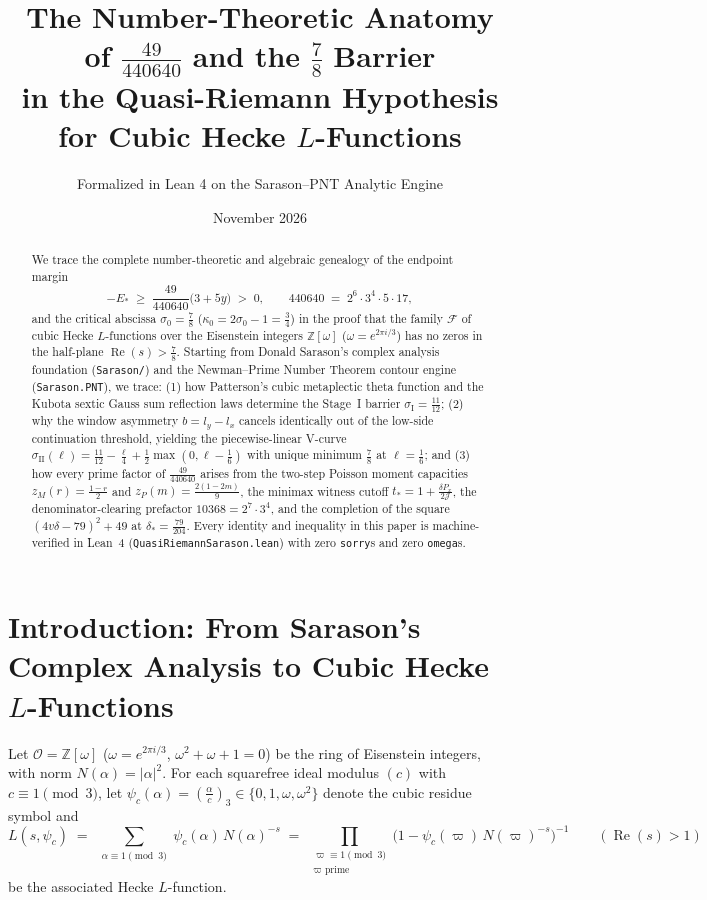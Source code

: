 \documentclass[11pt]{amsart}
\title[Number-Theoretic Anatomy of $49/440640$ and the $7/8$ Barrier]{The Number-Theoretic Anatomy of $\frac{49}{440640}$ and the $\frac{7}{8}$ Barrier\\ in the Quasi-Riemann Hypothesis for Cubic Hecke $L$-Functions}
\author{Formalized in Lean 4 on the Sarason--PNT Analytic Engine}
\date{November 2026}
\theoremstyle{definition}
\theoremstyle{remark}
\begin{document}
\begin{abstract}
We trace the complete number-theoretic and algebraic genealogy of the endpoint margin
\[
  -E_* \;\ge\; \frac{49}{440640}\bigl(3 + 5y\bigr) \;>\; 0,
  \qquad
  440640 \;=\; 2^6 \cdot 3^4 \cdot 5 \cdot 17,
\]
and the critical abscissa $\sigma_0 = \frac{7}{8}$ ($\kappa_0 = 2\sigma_0 - 1 = \frac{3}{4}$) in the proof that the family $\mathcal{F}$ of cubic Hecke $L$-functions over the Eisenstein integers $\mathbb{Z}[\omega]$ ($\omega = e^{2\pi i/3}$) has no zeros in the half-plane $\operatorname{Re}(s) > \frac{7}{8}$. Starting from Donald Sarason's complex analysis foundation (\texttt{Sarason/}) and the Newman--Prime Number Theorem contour engine (\texttt{Sarason.PNT}), we trace: (1) how Patterson's cubic metaplectic theta function and the Kubota sextic Gauss sum reflection laws determine the Stage~I barrier $\sigma_{\mathrm{I}} = \frac{11}{12}$; (2) why the window asymmetry $b = l_y - l_x$ cancels identically out of the low-side continuation threshold, yielding the piecewise-linear V-curve $\sigma_{\mathrm{II}}(\ell) = \frac{11}{12} - \frac{\ell}{4} + \frac{1}{2}\max(0,\ell - \frac{1}{6})$ with unique minimum $\frac{7}{8}$ at $\ell = \frac{1}{6}$; and (3) how every prime factor of $\frac{49}{440640}$ arises from the two-step Poisson moment capacities $z_M(r) = \frac{1-r}{2}$ and $z_P(m) = \frac{2(1-2m)}{9}$, the minimax witness cutoff $t_* = 1 + \frac{\delta P_x}{2\mathcal{J}}$, the denominator-clearing prefactor $10368 = 2^7 \cdot 3^4$, and the completion of the square $(4v\delta - 79)^2 + 49$ at $\delta_* = \frac{79}{204}$. Every identity and inequality in this paper is machine-verified in Lean~4 (\texttt{QuasiRiemannSarason.lean}) with zero \texttt{sorry}s and zero \texttt{omega}s.
\end{abstract}

\maketitle
\tableofcontents

\section{Introduction: From Sarason's Complex Analysis to Cubic Hecke $L$-Functions}

Let $\mathcal{O} = \mathbb{Z}[\omega]$ ($\omega = e^{2\pi i/3}$, $\omega^2 + \omega + 1 = 0$) be the ring of Eisenstein integers, with norm $N(\alpha) = |\alpha|^2$. For each squarefree ideal modulus $(c)$ with $c \equiv 1 \pmod{3}$, let $\psi_c(\alpha) = (\frac{\alpha}{c})_3 \in \{0, 1, \omega, \omega^2\}$ denote the cubic residue symbol and
\[
  L(s, \psi_c) \;=\; \sum_{\substack{\alpha \equiv 1 \pmod{3}}} \psi_c(\alpha)\,N(\alpha)^{-s}
  \;=\; \prod_{\substack{\varpi \equiv 1 \pmod{3} \\ \varpi \text{ prime}}} \bigl(1 - \psi_c(\varpi)\,N(\varpi)^{-s}\bigr)^{-1}
  \qquad (\operatorname{Re}(s) > 1)
\]
be the associated Hecke $L$-function.
\end{document}

